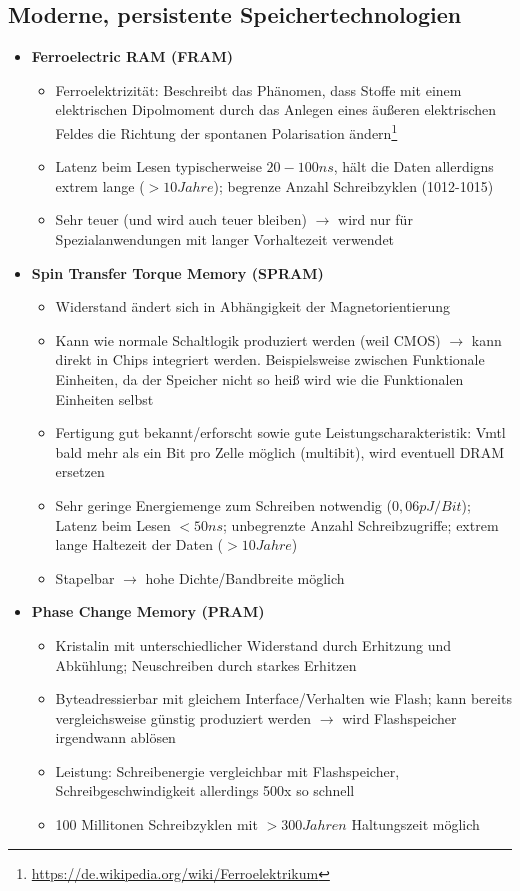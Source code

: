 \subsection{Moderne, persistente Speichertechnologien}
\begin{itemize}
	\item \textbf{Ferroelectric RAM (FRAM)}
	\begin{itemize}
		\item Ferroelektrizität: Beschreibt das Phänomen, dass Stoffe mit einem elektrischen Dipolmoment durch das Anlegen eines äußeren elektrischen Feldes die Richtung der spontanen Polarisation ändern\footnote{\url{https://de.wikipedia.org/wiki/Ferroelektrikum}}
		\item Latenz beim Lesen typischerweise \(20-100ns\), hält die Daten allerdigns extrem lange (\(>10 Jahre\)); begrenze Anzahl Schreibzyklen (1012-1015)
		\item Sehr teuer (und wird auch teuer bleiben) \(\rightarrow\) wird nur für Spezialanwendungen mit langer Vorhaltezeit verwendet
	\end{itemize}
	\item \textbf{Spin Transfer Torque Memory (SPRAM)}
	\begin{itemize}
		\item Widerstand ändert sich in Abhängigkeit der Magnetorientierung
		\item Kann wie normale Schaltlogik produziert werden (weil CMOS) \(\rightarrow\) kann direkt in Chips integriert werden. Beispielsweise zwischen Funktionale Einheiten, da der Speicher nicht so heiß wird wie die Funktionalen Einheiten selbst
		\item Fertigung gut bekannt/erforscht sowie gute Leistungscharakteristik: Vmtl bald mehr als ein Bit pro Zelle möglich (multibit), wird eventuell DRAM ersetzen
		\item Sehr geringe Energiemenge zum Schreiben notwendig (\(0,06pJ/Bit\)); Latenz beim Lesen \(< 50ns\); unbegrenzte Anzahl Schreibzugriffe; extrem lange Haltezeit der Daten (\(>10 Jahre\))
		\item Stapelbar \(\rightarrow\) hohe Dichte/Bandbreite möglich
	\end{itemize}
	\item \textbf{Phase Change Memory (PRAM)}
	\begin{itemize}
		\item Kristalin mit unterschiedlicher Widerstand durch Erhitzung und Abkühlung; Neuschreiben durch starkes Erhitzen
		\item Byteadressierbar mit gleichem Interface/Verhalten wie Flash; kann bereits vergleichsweise günstig produziert werden \(\rightarrow\) wird Flashspeicher irgendwann ablösen
		\item Leistung: Schreibenergie vergleichbar mit Flashspeicher, Schreibgeschwindigkeit allerdings 500x so schnell
		\item 100 Millitonen Schreibzyklen mit \(>300 Jahren\) Haltungszeit möglich
	\end{itemize}
\end{itemize}



